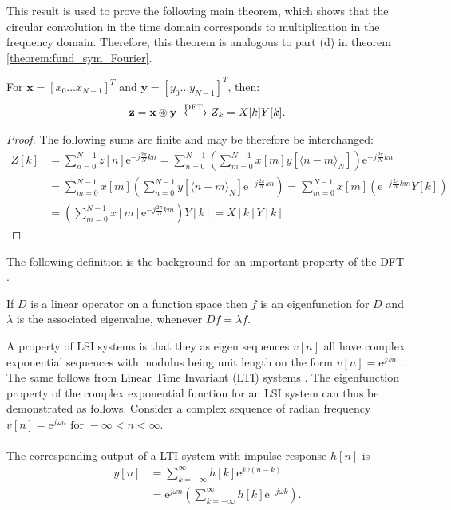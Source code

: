 This result is used to prove the following main theorem, which shows that the circular convolution in the time domain corresponds to multiplication in the frequency domain. Therefore, this theorem is analogous to part (d) in theorem \ref{theorem:fund_sym_Fourier}.

\begin{theorem}
For $\textbf{x} = [x_0 \dots x_{N-1}]^T$ and $\textbf{y} = [y_0 \dots y_{N-1}]^T$, then:
\begin{align*}
\textbf{z} = \textbf{x} \circledast \textbf{y} \xleftrightarrow{\text{DFT}} Z_k = X[k] Y[k].
\end{align*}
\end{theorem}

\begin{proof}
The following sums are finite and may be therefore be interchanged:
\begin{align*}
Z[k] &= \sum_{n=0}^{N-1} z[n] \text{e}^{-j\frac{2\pi}{N}kn} = \sum_{n=0}^{N-1} \left( \sum_{m=0}^{N-1} x[m] y[\langle n-m\rangle_N] \right) \text{e}^{-j\frac{2\pi}{N}kn} \\
&= \sum_{m=0}^{N-1} x[m] \left( \sum_{n=0}^{N-1} y[\langle n-m\rangle_N]\text{e}^{-j\frac{2\pi}{N}kn} \right) = \sum_{m=0}^{N-1} x[m] \left( \text{e}^{-j\frac{2\pi}{N}km}Y[k] \right) \\
&= \left( \sum_{m=0}^{N-1} x[m] \text{e}^{-j\frac{2\pi}{N}km} \right)Y[k] = X[k] Y[k]
\end{align*}
\end{proof}

The following definition is the background for an important property of the DFT \cite{Eigenfunctions}.

\begin{definition}
If $D$ is a linear operator on a function space then $f$ is an eigenfunction for $D$ and $\lambda$ is the associated eigenvalue, whenever $Df = \lambda f$.
\end{definition}

A property of LSI systems is that they as eigen sequences $v[n]$ all have complex exponential sequences with modulus being unit length on the form $v[n] = \text{e}^{j \omega n}$ \cite{FSP}.\\ The same follows from Linear Time Invariant (LTI) systems \cite{DTSP}.
The eigenfunction property of the complex exponential function for an LSI system can thus be demonstrated as follows. Consider a complex sequence of radian frequency $v[n] = \text{e}^{j\omega n} \text{ for } -\infty < n < \infty$.
\\\\
The corresponding output of a LTI system with impulse response $h[n]$ is
\begin{align*}
y[n] 
&= \sum_{k=-\infty}^{\infty} h[k]\text{e}^{j\omega(n-k)} \nonumber \\ 
&= \text{e}^{j\omega n} \left(\sum_{k=-\infty}^{\infty} h[k]\text{e}^{-j\omega k} \right).
\end{align*}

